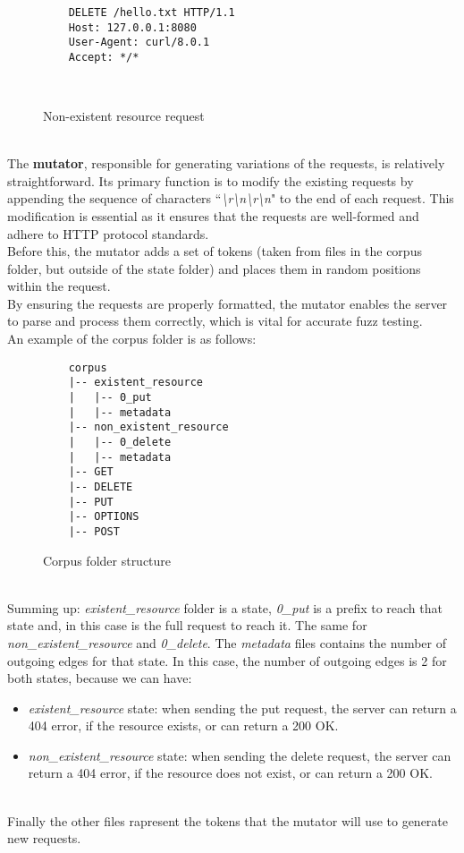 \begin{figure}[H]
    \centering
    \begin{adjustbox}{valign=t}
    \begin{lstlisting}
    DELETE /hello.txt HTTP/1.1
    Host: 127.0.0.1:8080
    User-Agent: curl/8.0.1
    Accept: */*

    
    \end{lstlisting}
    \end{adjustbox}
    \caption{Non-existent resource request}
    \label{tab:nonexistent_resource}
\end{figure}
\phantom{}\\
The \textbf{mutator}, responsible for generating variations of the requests, is relatively straightforward. Its primary function is to modify the existing requests by appending the sequence of characters ``\textit{\textbackslash r\textbackslash n\textbackslash r\textbackslash n}" to the end of each request. This modification is essential as it ensures that the requests are well-formed and adhere to HTTP protocol standards.
\\Before this, the mutator adds a set of tokens (taken from files in the corpus folder, but outside of the state folder) and places them in random positions within the request.
\\By ensuring the requests are properly formatted, the mutator enables the server to parse and process them correctly, which is vital for accurate fuzz testing.
\\An example of the corpus folder is as follows:
\begin{figure}[H]
    \centering
    \begin{adjustbox}{valign=t}
    \begin{lstlisting}
    corpus
    |-- existent_resource
    |   |-- 0_put
    |   |-- metadata
    |-- non_existent_resource
    |   |-- 0_delete
    |   |-- metadata
    |-- GET
    |-- DELETE
    |-- PUT
    |-- OPTIONS
    |-- POST
    \end{lstlisting}
    \end{adjustbox}
    \caption{Corpus folder structure}
\end{figure}
\phantom{}\\
Summing up: \textit{existent\_resource} folder is a state, \textit{0\_put} is a prefix to reach that state and, in this case is the full request to reach it. The same for \textit{non\_existent\_resource} and \textit{0\_delete}. The \textit{metadata} files contains the number of outgoing edges for that state. In this case, the number of outgoing edges is 2 for both states, because we can have:
\begin{itemize}
    \item \textit{existent\_resource} state: when sending the put request, the server can return a 404 error, if the resource exists, or can return a 200 OK.
    \item \textit{non\_existent\_resource} state: when sending the delete request, the server can return a 404 error, if the resource does not exist, or can return a 200 OK.
\end{itemize}
\phantom{}\\
Finally the other files rapresent the tokens that the mutator will use to generate new requests.


